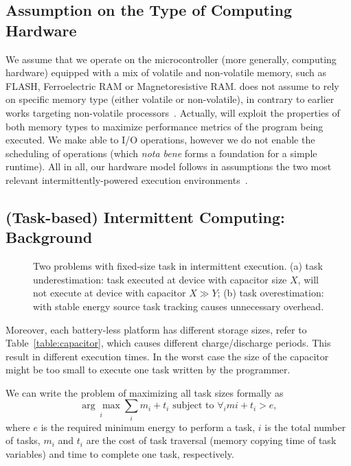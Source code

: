 \subsection{Assumption on the Type of Computing Hardware}
\label{sec:background_hardware}

We assume that we operate on the microcontroller (more generally, computing hardware) equipped with a mix of volatile and non-volatile memory, such as FLASH, Ferroelectric RAM or Magnetoresistive RAM. \sys does not assume to rely on specific memory type (either volatile or non-volatile), in contrary to earlier works targeting non-volatile processors~\cite{su_date_2017,ratchet,quickrecall,nvp}. Actually, \sys will exploit the properties of both memory types to maximize performance metrics of the program being executed. We make \sys able to I/O operations, however we do not enable the scheduling of operations (which \emph{nota bene} forms a foundation for a simple runtime). All in all, our hardware model follows in assumptions the two most relevant intermittently-powered execution environments~\cite{alpaca,chain}.

\subsection{(Task-based) Intermittent Computing: Background}

\begin{figure}
	\centering
	\caption{Two problems with fixed-size task in intermittent execution. (a) task underestimation: task executed at device with capacitor size $X$, will not execute at device with capacitor $X\gg Y$; (b) task overestimation: with stable energy source task tracking causes unnecessary overhead.}
	\label{fig:fixed_task_problem}
\end{figure}

Moreover, each battery-less platform has different storage sizes, refer to Table~\ref{table:capacitor}, which causes different charge/discharge periods. This result in different execution times. In the worst case the size of the capacitor might be too small to execute one task written by the programmer.

We can write the problem of maximizing all task sizes formally as
%
\begin{equation}
\underset{i}{\arg\,\max} \sum_{i}m_i+t_i \text{~subject to~} \forall_i mi+t_i>e,
\end{equation}
%
where $e$ is the required minimum energy to perform a task, $i$ is the total number of tasks, $m_i$ and $t_i$ are the cost of task traversal (memory copying time of task variables) and time to complete one task, respectively.

